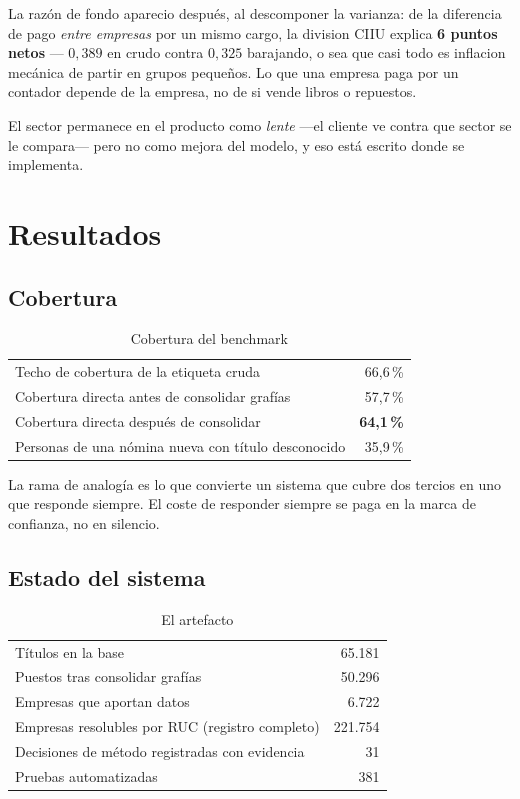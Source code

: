 \documentclass[12pt,a4paper]{report}
\begin{document}
La razón de fondo aparecio después, al descomponer la varianza: de la diferencia
de pago \emph{entre empresas} por un mismo cargo, la division CIIU explica
\textbf{6 puntos netos} --- $0{,}389$ en crudo contra $0{,}325$ barajando, o sea
que casi todo es inflacion mecánica de partir en grupos pequeños. Lo que una
empresa paga por un contador depende de la empresa, no de si vende libros o
repuestos.

El sector permanece en el producto como \emph{lente} ---el cliente ve contra que
sector se le compara--- pero no como mejora del modelo, y eso está escrito donde
se implementa.

\chapter{Resultados}

\section{Cobertura}

\begin{table}[h]
\centering
\caption{Cobertura del benchmark}
\begin{tabular}{lr}
\toprule
Techo de cobertura de la etiqueta cruda & 66,6\,\% \\
Cobertura directa antes de consolidar grafías & 57,7\,\% \\
Cobertura directa después de consolidar & \textbf{64,1\,\%} \\
Personas de una nómina nueva con título desconocido & 35,9\,\% \\
\bottomrule
\end{tabular}
\end{table}

La rama de analogía es lo que convierte un sistema que cubre dos tercios en uno
que responde siempre. El coste de responder siempre se paga en la marca de
confianza, no en silencio.

\section{Estado del sistema}

\begin{table}[h]
\centering
\caption{El artefacto}
\begin{tabular}{lr}
\toprule
Títulos en la base & 65.181 \\
Puestos tras consolidar grafías & 50.296 \\
Empresas que aportan datos & 6.722 \\
Empresas resolubles por RUC (registro completo) & 221.754 \\
Decisiones de método registradas con evidencia & 31 \\
Pruebas automatizadas & 381 \\
\bottomrule
\end{tabular}
\end{table}
\end{document}
